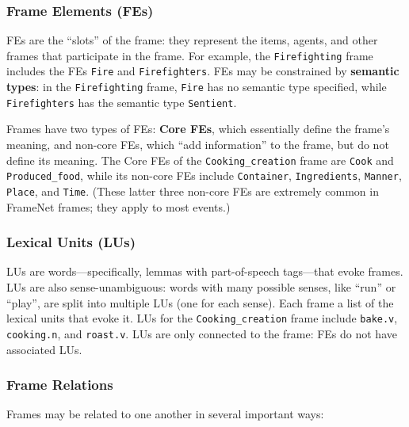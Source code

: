 \subsubsection{Frame Elements (FEs)}
FEs are the ``slots'' of the frame: they represent the items, agents, and other frames that participate in the frame. For example, the \texttt{Firefighting} frame includes the FEs \texttt{Fire} and \texttt{Firefighters}. FEs may be constrained by \textbf{semantic types}: in the \texttt{Firefighting} frame, \texttt{Fire} has no semantic type specified, while \texttt{Firefighters} has the semantic type \texttt{Sentient}.

Frames have two types of FEs: \textbf{Core FEs}, which essentially define the frame's meaning, and non-core FEs, which ``add information'' to the frame, but do not define its meaning. The Core FEs of the \texttt{Cooking\_creation} frame are \texttt{Cook} and \texttt{Produced\_food}, while its non-core FEs include \texttt{Container}, \texttt{Ingredients}, \texttt{Manner}, \texttt{Place}, and \texttt{Time}. (These latter three non-core FEs are extremely common in FrameNet frames; they apply to most events.)

\subsubsection{Lexical Units (LUs)}
LUs are words---specifically, lemmas with part-of-speech tags---that evoke frames. LUs are also sense-unambiguous: words with many possible senses, like ``run'' or ``play'', are split into multiple LUs (one for each sense). Each frame a list of the lexical units that evoke it. LUs for the \texttt{Cooking\_creation} frame include \texttt{bake.v}, \texttt{cooking.n}, and \texttt{roast.v}. LUs are only connected to the frame: FEs do not have associated LUs.

\subsubsection{Frame Relations}
Frames may be related to one another in several important ways:

